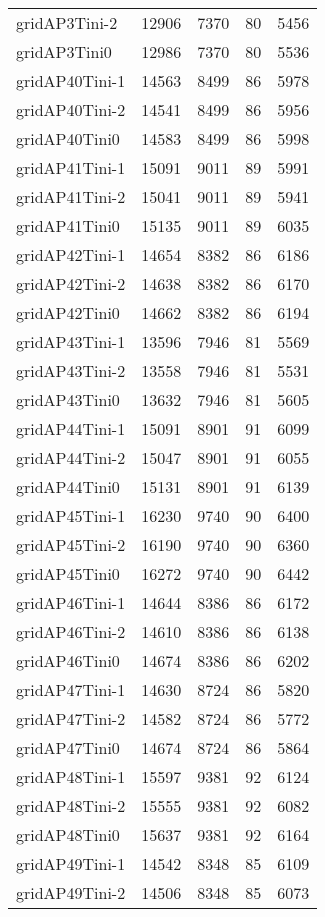 \begin{longtable}{lrrrr}
gridAP3Tini-2 & 12906 & 7370 & 80 & 5456 \\
gridAP3Tini0 & 12986 & 7370 & 80 & 5536 \\
gridAP40Tini-1 & 14563 & 8499 & 86 & 5978 \\
gridAP40Tini-2 & 14541 & 8499 & 86 & 5956 \\
gridAP40Tini0 & 14583 & 8499 & 86 & 5998 \\
gridAP41Tini-1 & 15091 & 9011 & 89 & 5991 \\
gridAP41Tini-2 & 15041 & 9011 & 89 & 5941 \\
gridAP41Tini0 & 15135 & 9011 & 89 & 6035 \\
gridAP42Tini-1 & 14654 & 8382 & 86 & 6186 \\
gridAP42Tini-2 & 14638 & 8382 & 86 & 6170 \\
gridAP42Tini0 & 14662 & 8382 & 86 & 6194 \\
gridAP43Tini-1 & 13596 & 7946 & 81 & 5569 \\
gridAP43Tini-2 & 13558 & 7946 & 81 & 5531 \\
gridAP43Tini0 & 13632 & 7946 & 81 & 5605 \\
gridAP44Tini-1 & 15091 & 8901 & 91 & 6099 \\
gridAP44Tini-2 & 15047 & 8901 & 91 & 6055 \\
gridAP44Tini0 & 15131 & 8901 & 91 & 6139 \\
gridAP45Tini-1 & 16230 & 9740 & 90 & 6400 \\
gridAP45Tini-2 & 16190 & 9740 & 90 & 6360 \\
gridAP45Tini0 & 16272 & 9740 & 90 & 6442 \\
gridAP46Tini-1 & 14644 & 8386 & 86 & 6172 \\
gridAP46Tini-2 & 14610 & 8386 & 86 & 6138 \\
gridAP46Tini0 & 14674 & 8386 & 86 & 6202 \\
gridAP47Tini-1 & 14630 & 8724 & 86 & 5820 \\
gridAP47Tini-2 & 14582 & 8724 & 86 & 5772 \\
gridAP47Tini0 & 14674 & 8724 & 86 & 5864 \\
gridAP48Tini-1 & 15597 & 9381 & 92 & 6124 \\
gridAP48Tini-2 & 15555 & 9381 & 92 & 6082 \\
gridAP48Tini0 & 15637 & 9381 & 92 & 6164 \\
gridAP49Tini-1 & 14542 & 8348 & 85 & 6109 \\
gridAP49Tini-2 & 14506 & 8348 & 85 & 6073 \\

\end{longtable}
